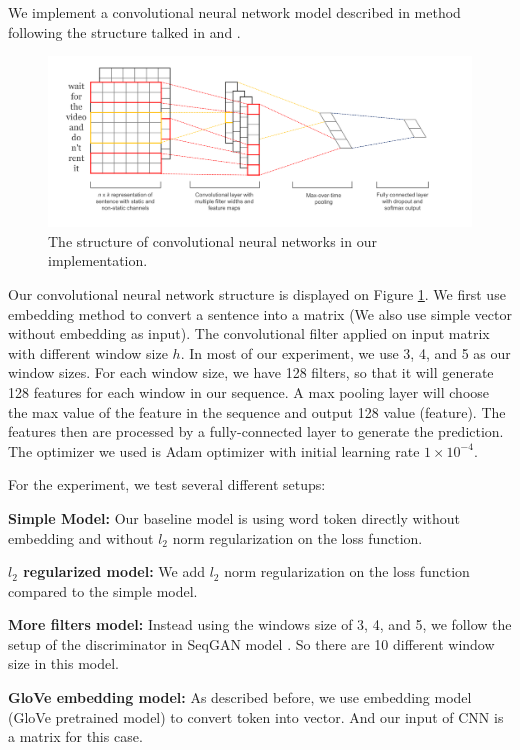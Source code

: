 \documentclass[11pt]{article}
\begin{document}
We implement a convolutional neural network model described in method following the structure talked in \cite{kim2014cnntext} and \cite{cnnimplement}.

\begin{figure}[tbp]
    \centering
    \includegraphics[width=0.9\linewidth]{CNN_structure.png}
    \caption{The structure of convolutional neural networks in our implementation.}
    \label{fig:cnn}
\end{figure}

Our convolutional neural network structure is displayed on Figure \ref{fig:cnn}. We first use embedding method to convert a sentence into a matrix (We also use simple vector without embedding as input). The convolutional filter applied on input matrix with different window size \(h\). In most of our experiment, we use 3, 4, and 5 as our window sizes. For each window size, we have 128 filters, so that it will generate 128 features for each window in our sequence. A max pooling layer will choose the max value of the feature in the sequence and output 128 value (feature). The features then are processed by a fully-connected layer to generate the prediction. The optimizer we used is Adam optimizer with initial learning rate \(1\times 10^{-4}\).

For the experiment, we test several different setups:

\textbf{Simple Model:} Our baseline model is using word token directly without embedding and without \(l_2\) norm regularization on the loss function.

\textbf{\(l_2\) regularized model:} We add \(l_2\) norm regularization on the loss function compared to the simple model.

\textbf{More filters model:} Instead using the windows size of 3, 4, and 5, we follow the setup of the discriminator in SeqGAN model \cite{yu2017seqgan}. So there are 10 different window size in this model.

\textbf{GloVe embedding model:} As described before, we use embedding model (GloVe pretrained model) to convert token into vector. And our input of CNN is a matrix for this case.
\end{document}
